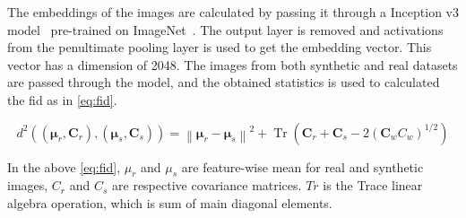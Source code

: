 The embeddings of the images are calculated by passing it through a Inception v3 model~\cite{Szegedy2016RethinkingTI} pre-trained on ImageNet~\cite{Deng2009ImageNetAL}.
The output layer is removed and activations from the penultimate pooling layer is used to get the embedding vector.
This vector has a dimension of 2048.
The images from both synthetic and real datasets are passed through the model, and the obtained statistics is used to calculated the \gls{fid} as in \autoref{eq:fid}.

\begin{equation}
    d^{2}\left((\boldsymbol{\mu}_{r}, \boldsymbol{C}_{r}),\left(\boldsymbol{\mu}_{s}, \boldsymbol{C}_{s}\right)\right)=\left\|\boldsymbol{\mu}_{r}-\boldsymbol{\mu}_{s}\right\|^{2}+\operatorname{Tr}\left(\boldsymbol{C}_{r}+\boldsymbol{C}_{s}-2\left(\boldsymbol{C}_{w} {C}_{w}\right)^{1 / 2}\right)
    \label{eq:fid}
\end{equation}

In the above \autoref{eq:fid}, $\mu_r$ and $\mu_s$ are feature-wise mean for real and synthetic images, $C_r$ and $C_s$ are respective covariance matrices.
$Tr$ is the Trace linear algebra operation, which is sum of main diagonal elements.



